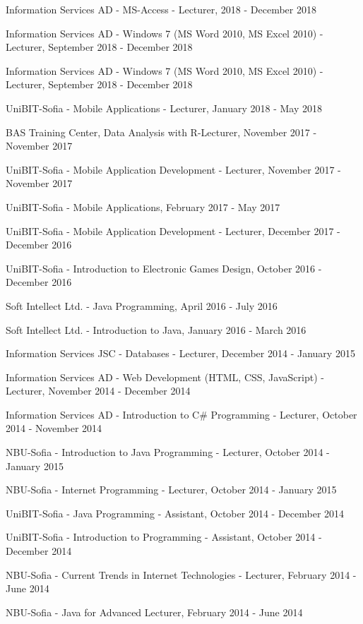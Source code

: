 \documentclass[english,a4paper]{europasscv}
\begin{document}
\begin{europasscv}
{\begin{ecvitemize}
    \item Information Services AD - MS-Access - Lecturer, 2018 - December 2018
    \item Information Services AD - Windows 7 (MS Word 2010, MS Excel 2010) - Lecturer, September 2018 - December 2018
    \item Information Services AD - Windows 7 (MS Word 2010, MS Excel 2010) - Lecturer, September 2018 - December 2018
    \item UniBIT-Sofia - Mobile Applications - Lecturer, January 2018 - May 2018
    \item BAS Training Center, Data Analysis with R-Lecturer, November 2017 - November 2017
    \item UniBIT-Sofia - Mobile Application Development - Lecturer, November 2017 - November 2017
    \item UniBIT-Sofia - Mobile Applications, February 2017 - May 2017
    \item UniBIT-Sofia - Mobile Application Development - Lecturer, December 2017 - December 2016
    \item UniBIT-Sofia - Introduction to Electronic Games Design, October 2016 - December 2016
    \item Soft Intellect Ltd. - Java Programming, April 2016 - July 2016
    \item Soft Intellect Ltd. - Introduction to Java, January 2016 - March 2016
    \item Information Services JSC - Databases - Lecturer, December 2014 - January 2015
    \item Information Services AD - Web Development (HTML, CSS, JavaScript) - Lecturer, November 2014 - December 2014
    \item Information Services AD - Introduction to C\# Programming - Lecturer, October 2014 - November 2014
    \item NBU-Sofia - Introduction to Java Programming - Lecturer, October 2014 - January 2015
    \item NBU-Sofia - Internet Programming - Lecturer, October 2014 - January 2015
    \item UniBIT-Sofia - Java Programming - Assistant, October 2014 - December 2014
    \item UniBIT-Sofia - Introduction to Programming - Assistant, October 2014 - December 2014
    \item NBU-Sofia - Current Trends in Internet Technologies - Lecturer, February 2014 - June 2014
    \item NBU-Sofia - Java for Advanced Lecturer, February 2014 - June 2014

\end{ecvitemize}}
\end{europasscv}
\end{document}

